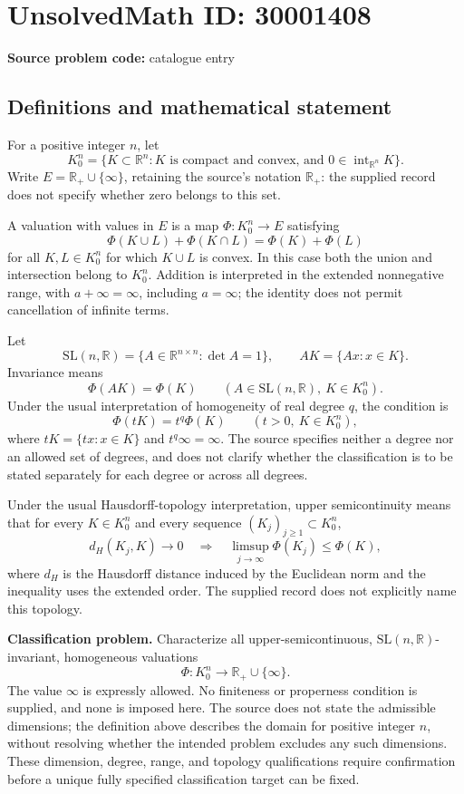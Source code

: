 \documentclass[11pt]{article}
\newcommand{\R}{\mathbb{R}}
\begin{document}
\section*{UnsolvedMath ID: 30001408}
\textbf{Source problem code:} catalogue entry
\subsection{Definitions and mathematical statement}
For a positive integer \(n\), let
\[
K_0^n=\{K\subset\R^n:K\text{ is compact and convex, and }0\in\operatorname{int}_{\R^n}K\}.
\]
Write \(E=\mathbb R_+\cup\{\infty\}\), retaining the source's notation \(\mathbb R_+\): the supplied record does not specify whether zero belongs to this set.

A valuation with values in \(E\) is a map \(\Phi:K_0^n\to E\) satisfying
\[
\Phi(K\cup L)+\Phi(K\cap L)=\Phi(K)+\Phi(L)
\]
for all \(K,L\in K_0^n\) for which \(K\cup L\) is convex. In this case both the union and intersection belong to \(K_0^n\). Addition is interpreted in the extended nonnegative range, with \(a+\infty=\infty\), including \(a=\infty\); the identity does not permit cancellation of infinite terms.

Let
\[
\mathrm{SL}(n,\R)=\{A\in\R^{n\times n}:\det A=1\},\qquad AK=\{Ax:x\in K\}.
\]
Invariance means
\[
\Phi(AK)=\Phi(K)\qquad(A\in\mathrm{SL}(n,\R),\ K\in K_0^n).
\]
Under the usual interpretation of homogeneity of real degree \(q\), the condition is
\[
\Phi(tK)=t^q\Phi(K)\qquad(t>0,\ K\in K_0^n),
\]
where \(tK=\{tx:x\in K\}\) and \(t^q\infty=\infty\). The source specifies neither a degree nor an allowed set of degrees, and does not clarify whether the classification is to be stated separately for each degree or across all degrees.

Under the usual Hausdorff-topology interpretation, upper semicontinuity means that for every \(K\in K_0^n\) and every sequence \((K_j)_{j\geq1}\subset K_0^n\),
\[
d_H(K_j,K)\longrightarrow0
\quad\Longrightarrow\quad
\limsup_{j\to\infty}\Phi(K_j)\leq\Phi(K),
\]
where \(d_H\) is the Hausdorff distance induced by the Euclidean norm and the inequality uses the extended order. The supplied record does not explicitly name this topology.

\textbf{Classification problem.} Characterize all upper-semicontinuous, \(\mathrm{SL}(n,\R)\)-invariant, homogeneous valuations
\[
\Phi:K_0^n\longrightarrow\mathbb R_+\cup\{\infty\}.
\]
The value \(\infty\) is expressly allowed. No finiteness or properness condition is supplied, and none is imposed here. The source does not state the admissible dimensions; the definition above describes the domain for positive integer \(n\), without resolving whether the intended problem excludes any such dimensions. These dimension, degree, range, and topology qualifications require confirmation before a unique fully specified classification target can be fixed.
\end{document}
